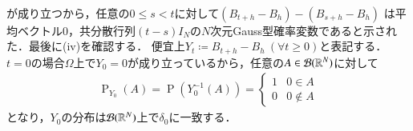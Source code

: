 \begin{prf}
\begin{description}
\begin{align}
		\end{align}
		が成り立つから，任意の$0 \leq s < t$に対して$(B_{t+h} - B_h) - (B_{s+h} - B_h) $
		は平均ベクトル0，共分散行列$(t-s)I_N$の$N$次元Gauss型確率変数であると示された．最後に(iv)を確認する．
		便宜上$Y_t \coloneqq B_{t+h} - B_h\ (\forall t \geq 0)$と表記する．
		$t=0$の場合$\Omega$上で$Y_0 = 0$が成り立っているから，任意の$A \in \mathcal{B}(\mathbb{R}^N)$に対して
		\begin{align}
			\operatorname{P}_{Y_0}(A) 
			= \operatorname{P}\left(Y_0^{-1}(A)\right) 
			= \begin{cases}
				1 & 0 \in A \\
				0 & 0 \notin A
			\end{cases}
		\end{align}
		となり，$Y_0$の分布は$\mathcal{B}(\mathbb{R}^N)$上で$\delta_0$に一致する．
		\QED
	

\end{description}
\end{prf}
